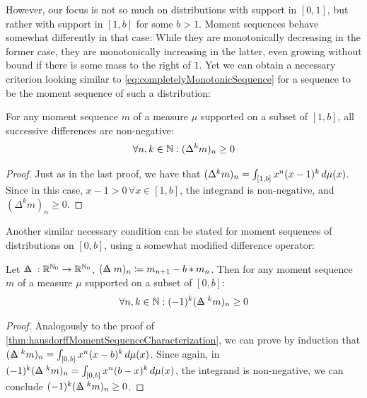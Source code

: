 \documentclass[a4paper]{scrreprt}
\begin{document}
    However, our focus is not so much on distributions with support in $[0, 1]$, but rather with support in $[1, b]$ for some $b > 1$.
    Moment sequences behave somewhat differently in that case: While they are monotonically decreasing in the former case, they are monotonically increasing in the latter, even growing without bound if there is some mass to the right of $1$.
    Yet we can obtain a necessary criterion looking similar to \eqref{eq:completelyMonotonicSequence} for a sequence to be the moment sequence of such a distribution:
    \begin{cor}
        \label{cor:hausdorff-1-b-necessaryCondition}
        For any moment sequence $m$ of a measure $\mu$ supported on a subset of $[1, b]$, all successive differences are non-negative:
        \begin{gather}
            \forall n, k \in \mathbb{N}: (\Delta^k m)_n \geq 0
        \end{gather}
    \end{cor}
    \begin{proof}
        Just as in the last proof, we have that $(\Delta^k m)_n = \int_{[1, b]} x^n (x-1)^k \, d\mu(x)$.
        Since in this case, $x-1 > 0 \,\forall x \in [1, b]$, the integrand is non-negative, and $(\Delta^k m)_n \geq 0$.
    \end{proof}

    Another similar necessary condition can be stated for moment sequences of distributions on $[0, b]$, using a somewhat modified difference operator:
    \newcommand{\DeltaB}[1]{\Delta\hspace{-.225cm}{\mathrel{\raisebox{0.045cm}{\scalebox{.9}{$\scriptscriptstyle#1$}}}\hspace{.22cm}}}
    \begin{lemma}
        \label{lemma:hausdorff-0-b-necessaryCondition}
        Let $\DeltaB{b}: \R^{\N_0} \to \R^{\N_0}$, $(\DeltaB{b} m)_n \coloneqq m_{n+1} - b * m_n$.
        Then for any moment sequence $m$ of a measure $\mu$ supported on a subset of $[0, b]$:
        \begin{gather}            
            \forall n, k \in \N: (-1)^k (\DeltaB{b}^k m)_n \geq 0
        \end{gather}
    \end{lemma}
    \begin{proof}
        Analogously to the proof of \ref{thm:hausdorffMomentSequenceCharacterization},
        we can prove by induction that $(\DeltaB{b}^k m)_n = \lintegral{[0, b]}{x^n (x-b)^k}{\mu(x)}$.
        Since again, in $(-1)^k (\DeltaB{b}^k m)_n = \lintegral{[0, b]}{x^n (b - x)^k}{\mu(x)}$, the integrand is non-negative, we can conclude $(-1)^k (\DeltaB{b}^k m)_n \geq 0$.
    \end{proof}
\end{document}
